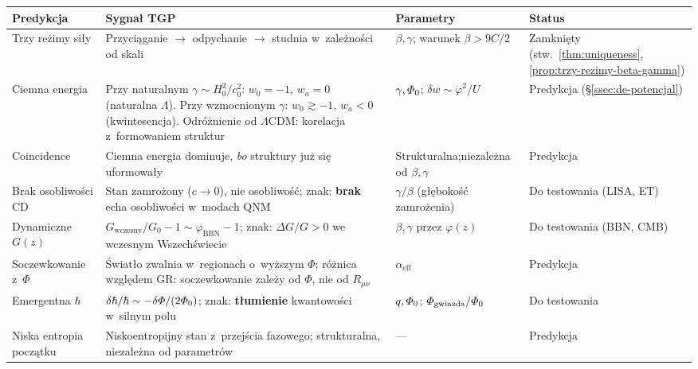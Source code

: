 \begin{center}
\small
\begin{tabular}{@{}>{\raggedright}p{2.5cm}p{5.5cm}p{2.2cm}p{2.5cm}@{}}
\toprule
\textbf{Predykcja} & \textbf{Sygna\l{} TGP}
  & \textbf{Parametry} & \textbf{Status} \\
\midrule
Trzy re\.zimy si\l{}y
  & Przyci\k{a}ganie $\to$ odpychanie $\to$ studnia
    w~zale\.zno\'sci od skali
  & $\beta, \gamma$; warunek $\beta > 9C/2$
  & Zamkni\k{e}ty (stw.~\ref{thm:uniqueness}, \ref{prop:trzy-rezimy-beta-gamma}) \\[4pt]
Ciemna energia
  & Przy naturalnym $\gamma \sim H_0^2/c_0^2$:
    $w_0 = -1$, $w_a = 0$ (naturalna $\Lambda$).
    Przy wzmocnionym $\gamma$:
    $w_0 \gtrsim -1$, $w_a < 0$ (kwintesencja).
    Odr\'o\.znienie od $\Lambda$CDM: korelacja z~formowaniem
    struktur
  & $\gamma, \varPhi_0$;\newline
    $\delta w \sim \dot\varphi^2/U$
  & Predykcja (\S\ref{ssec:de-potencjal}) \\[4pt]
Coincidence
  & Ciemna energia dominuje, \emph{bo} struktury
    ju\.z si\k{e} uformowa\l{}y
  & Strukturalna;\newline niezale\.zna od $\beta,\gamma$
  & Predykcja \\[4pt]
Brak osobliwo\'sci CD
  & Stan zamro\.zony ($c \to 0$),
    nie osobliwo\'s\'c; znak: \textbf{brak}
    echa osobliwo\'sci w~modach QNM
  & $\gamma/\beta$ (g\l{}\k{e}boko\'s\'c zamro\.zenia)
  & Do testowania (LISA, ET) \\[4pt]
Dynamiczne $G(z)$
  & $G_{\mathrm{wczesny}}/G_0 - 1
    \sim \varphi_{\mathrm{BBN}} - 1$;
    znak: $\Delta G/G > 0$ we wczesnym
    Wszech\'swiecie
  & $\beta, \gamma$ przez $\varphi(z)$
  & Do testowania (BBN, CMB) \\[4pt]
Soczewkowanie z~$\Phi$
  & \'Swiat\l{}o zwalnia w~regionach
    o~wy\.zszym $\Phi$; r\'o\.znica wzgl\k{e}dem GR:
    soczewkowanie zale\.zy od $\Phi$, nie od $R_{\mu\nu}$
  & $\alpha_{\mathrm{eff}}$
  & Predykcja \\[4pt]
Emergentna $\hbar$
  & $\delta\hbar/\hbar \sim -\delta\varPhi/(2\varPhi_0)$;
    znak: \textbf{t\l{}umienie} kwantowo\'sci
    w~silnym polu
  & $q, \varPhi_0$;\newline
    $\varPhi_{\mathrm{gwiazda}}/\varPhi_0$
  & Do testowania \\[4pt]
Niska entropia pocz\k{a}tku
  & Niskoentropijny stan z~przej\'scia fazowego;
    strukturalna, niezale\.zna od parametr\'ow
  & ---
  & Predykcja \\[4pt]

\end{tabular}
\end{center}
